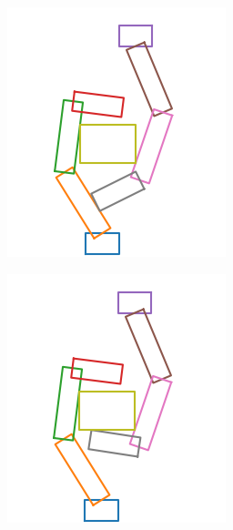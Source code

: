 \documentclass[a4paper,twoside,12pt,papersize, dvipdfmx]{iirthesis}
\begin{document}
{\begin{figure}[b]
\begin{minipage}{0.33\hsize}
\end{minipage}\hfill
\begin{minipage}{0.33\hsize}
\includegraphics[width=0.9\hsize]{fig/3-new-planner/rec_FC_left_right.png}
\label{fig::planner::afterfclr}
\end{minipage}\hfill
\begin{minipage}{0.33\hsize}
\includegraphics[width=0.9\hsize]{fig/3-new-planner/rec_FC_right_left.png}
\label{fig::planner::afterfcrl}
\end{minipage}
\end{figure}

}
\end{document}
